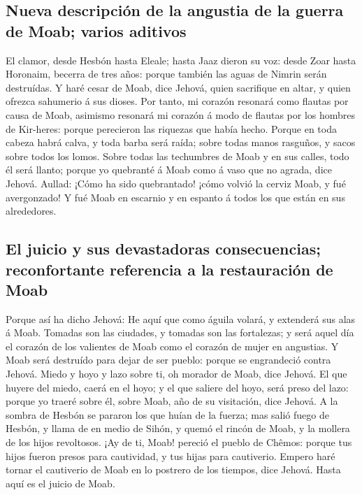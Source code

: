 \hypertarget{nueva-descripciuxf3n-de-la-angustia-de-la-guerra-de-moab-varios-aditivos}{%
\subsection{Nueva descripción de la angustia de la guerra de Moab;
varios
aditivos}\label{nueva-descripciuxf3n-de-la-angustia-de-la-guerra-de-moab-varios-aditivos}}

 El clamor, desde Hesbón hasta Eleale; hasta Jaaz dieron
su voz: desde Zoar hasta Horonaim, becerra de tres años: porque también
las aguas de Nimrin serán destruídas.  Y haré cesar de
Moab, dice Jehová, quien sacrifique en altar, y quien ofrezca sahumerio
á sus dioses.  Por tanto, mi corazón resonará como
flautas por causa de Moab, asimismo resonará mi corazón á modo de
flautas por los hombres de Kir-heres: porque perecieron las riquezas que
había hecho.  Porque en toda cabeza habrá calva, y toda
barba será raída; sobre todas manos rasguños, y sacos sobre todos los
lomos.  Sobre todas las techumbres de Moab y en sus
calles, todo él será llanto; porque yo quebranté á Moab como á vaso que
no agrada, dice Jehová.  Aullad: ¡Cómo ha sido
quebrantado! ¡cómo volvió la cerviz Moab, y fué avergonzado! Y fué Moab
en escarnio y en espanto á todos los que están en sus alrededores.

\hypertarget{el-juicio-y-sus-devastadoras-consecuencias-reconfortante-referencia-a-la-restauraciuxf3n-de-moab}{%
\subsection{El juicio y sus devastadoras consecuencias; reconfortante
referencia a la restauración de
Moab}\label{el-juicio-y-sus-devastadoras-consecuencias-reconfortante-referencia-a-la-restauraciuxf3n-de-moab}}

 Porque así ha dicho Jehová: He aquí que como águila
volará, y extenderá sus alas á Moab.  Tomadas son las
ciudades, y tomadas son las fortalezas; y será aquel día el corazón de
los valientes de Moab como el corazón de mujer en angustias.
 Y Moab será destruído para dejar de ser pueblo: porque
se engrandeció contra Jehová.  Miedo y hoyo y lazo sobre
ti, oh morador de Moab, dice Jehová.  El que huyere del
miedo, caerá en el hoyo; y el que saliere del hoyo, será preso del lazo:
porque yo traeré sobre él, sobre Moab, año de su visitación, dice
Jehová.  A la sombra de Hesbón se pararon los que huían
de la fuerza; mas salió fuego de Hesbón, y llama de en medio de Sihón, y
quemó el rincón de Moab, y la mollera de los hijos revoltosos.
 ¡Ay de ti, Moab! pereció el pueblo de Chêmos: porque tus
hijos fueron presos para cautividad, y tus hijas para cautiverio.
 Empero haré tornar el cautiverio de Moab en lo postrero
de los tiempos, dice Jehová. Hasta aquí es el juicio de Moab.

